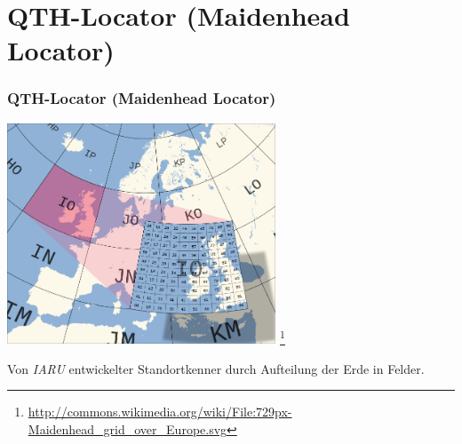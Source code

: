 \section[QTH-Locator]{QTH-Locator (Maidenhead Locator)}

\begin{frame}
    \frametitle{QTH-Locator (Maidenhead Locator)}

    \begin{center}
        \includegraphics[width=0.6\textwidth]{bv11/Maidenhead_grid_over_Europe.png}
        \footnote{\tiny \url{http://commons.wikimedia.org/wiki/File:729px-Maidenhead_grid_over_Europe.svg}}
    \end{center}

    Von \emph{IARU} entwickelter Standortkenner durch Aufteilung der Erde in Felder.

\end{frame}

